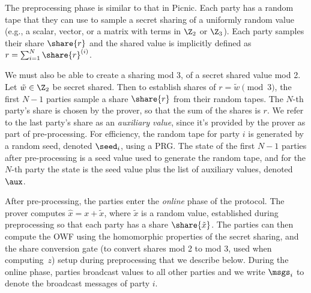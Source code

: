 The preprocessing phase is similar to that in Picnic.  Each party has a random
tape that they can use to sample a secret sharing of a uniformly random value
(e.g.,  a scalar, vector, or a matrix with terms in $\Z_2$ or $\Z_3$).  Each
party samples their share $\share{r}$ and the shared value is implicitly defined as
$r = \sum_{i=1}^N \share{r}^{(i)}$.

We must also be able to create a sharing mod 3, of a secret shared value mod 2.
Let $\tilde{w}\in\Z_2$ be secret shared.  Then to establish shares of $r = \tilde{w} \pmod
3$, the first $N-1$ parties sample a share $\share{r}$ from their random tapes. The
$N$-th party's share is chosen by the prover, so that the sum of the shares is
$r$.  We refer to the last party's share as an \emph{auxiliary value}, since
it's provided by the prover as part of pre-processing.  For efficiency, the random
tape for  party $i$ is
generated by a random seed, denoted $\seed_i$, using a PRG. The state of the first
$N-1$ parties after pre-processing is a seed value used to generate the random
tape, and for the $N$-th party the state is the seed value plus the list of
auxiliary values, denoted $\aux$.

After pre-processing, the parties enter the \emph{online} phase of the protocol.
The prover computes $\hat{x}= x + \tilde{x}$, where $\tilde{x}$ is a random value, established during
preprocessing so that each party has a share $\share{\tilde{x}}$.
The parties can then compute the OWF using the homomorphic properties of the secret sharing,
and the share conversion gate (to convert shares mod 2 to mod 3, used when computing~$z$)
setup during preprocessing that we describe below.
During the online phase, parties broadcast values to all other parties and we write $\msgs_i$
to denote the broadcast messages of party $i$.


